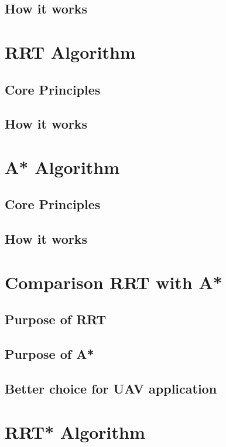 \subsection{How it works}

\section{RRT Algorithm}

\subsection{Core Principles}

\subsection{How it works}

\section{A* Algorithm}

\subsection{Core Principles}

\subsection{How it works}

\section{Comparison RRT with A*}

\subsection{Purpose of RRT}

\subsection{Purpose of A*}

\subsection{Better choice for UAV application}

\section{RRT* Algorithm}

